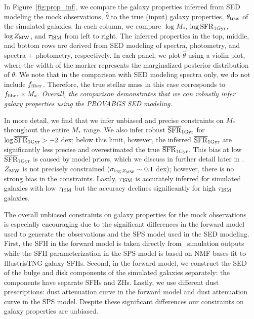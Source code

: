 In Figure~\ref{fig:prop_inf}, we compare the galaxy properties inferred from
SED modeling the mock observations, $\hat{\theta}$ to the true (input) galaxy
properties, $\theta_{\rm true}$ of the simulated galaxies.
In each column, we compare $\log M_*$, $\log \overline{\rm SFR}_{\rm 1Gyr}$, $\log Z_{\rm MW}$, and
$\tau_{\rm ISM}$ from left to right. 
The inferred properties in the top, middle, and bottom rows are derived from
SED modeling of spectra, photometry, and spectra + photometry, respectively.
In each panel, we plot $\hat{\theta}$ using a violin plot, where the width
of the marker represents the marginalized posterior distribution of $\theta$. 
We note that in the comparison with SED modeling spectra only, we do not
include $f_{\rm fiber}$. 
Therefore, the true stellar mass in this case corresponds to $f_{\rm fiber}
\times M_*$. 
\emph{Overall, the comparison demonstrates that we can robustly infer galaxy
properties using the {\sc PROVABGS} SED modeling}. 

In more detail, we find that we infer unbiased and precise constraints on
$M_*$ throughout the entire $M_*$ range. 
We also infer robust $\overline{\rm SFR}_{\rm 1Gyr}$ for $\log \overline{\rm SFR}_{\rm 1Gyr} > -2$ dex; below this limit,
however, the inferred $\overline{\rm SFR}_{\rm 1Gyr}$ are significantly less precise and
overestimated the true $\overline{\rm SFR}_{\rm 1Gyr}$. 
This bias at low $\overline{\rm SFR}_{\rm 1Gyr}$ is caused by model priors, which we discuss in
further detail later in . 
$Z_{\rm MW}$ is not precisely constrained ($\sigma_{\log Z_{\rm MW}} \sim 0.1$
dex); however, there is no strong bias in the constraints. 
Lastly, $\tau_{\rm ISM}$ is accurately inferred for simulated galaxies with
low $\tau_{\rm ISM}$ but the accuracy declines significantly for high 
$\tau_{\rm ISM}$ galaxies. 

The overall unbiased constraints on galaxy properties for the mock observations
is especially encouraging due to the significant differences in the forward
model used to generate the observations and the SPS model used in the SED
modeling. 
First, the SFH in the forward model is taken directly from \lgal~simulation
outputs while the SFH parameterization in the SPS model is based on NMF bases fit
to IllustrisTNG galaxy SFHs.
Second, in the forward model, we construct the SED of the bulge and disk
components of the simulated galaxies separately: the components have separate
SFHs and ZHs. 
Lastly, we use different dust prescriptions: \cite{mathis1983} dust attenuation  
curve in the forward model and \cite{kriek2013} dust attenuation curve in the
SPS model. 
Despite these significant differences our constraints on galaxy properties are
unbiased. 

